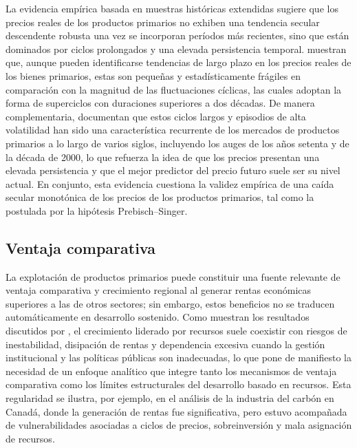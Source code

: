 \documentclass[../../TFM.tex]{subfiles}
\begin{document}
	La evidencia empírica basada en muestras históricas extendidas sugiere que los precios reales de los productos primarios no exhiben una tendencia secular descendente robusta una vez se incorporan períodos más recientes, sino que están dominados por ciclos prolongados y una elevada persistencia temporal. \textcite{Cashin2002} muestran que, aunque pueden identificarse tendencias de largo plazo en los precios reales de los bienes primarios, estas son pequeñas y estadísticamente frágiles en comparación con la magnitud de las fluctuaciones cíclicas, las cuales adoptan la forma de superciclos con duraciones superiores a dos décadas. De manera complementaria, \textcite{Jacks2011} documentan que estos ciclos largos y episodios de alta volatilidad han sido una característica recurrente de los mercados de productos primarios a lo largo de varios siglos, incluyendo los auges de los años setenta y de la década de 2000, lo que refuerza la idea de que los precios presentan una elevada persistencia y que el mejor predictor del precio futuro suele ser su nivel actual. En conjunto, esta evidencia cuestiona la validez empírica de una caída secular monotónica de los precios de los productos primarios, tal como la postulada por la hipótesis Prebisch--Singer.
	
	\subsection{Ventaja comparativa}
	\label{subsec:ventaja-comparativa}
	
	La explotación de productos primarios puede constituir una fuente relevante de ventaja comparativa y crecimiento regional al generar rentas económicas superiores a las de otros sectores; sin embargo, estos beneficios no se traducen automáticamente en desarrollo sostenido. Como muestran los resultados discutidos por \textcite{Gunton2003}, el crecimiento liderado por recursos suele coexistir con riesgos de inestabilidad, disipación de rentas y dependencia excesiva cuando la gestión institucional y las políticas públicas son inadecuadas, lo que pone de manifiesto la necesidad de un enfoque analítico que integre tanto los mecanismos de ventaja comparativa como los límites estructurales del desarrollo basado en recursos. Esta regularidad se ilustra, por ejemplo, en el análisis de la industria del carbón en Canadá, donde la generación de rentas fue significativa, pero estuvo acompañada de vulnerabilidades asociadas a ciclos de precios, sobreinversión y mala asignación de recursos.
	
\end{document}
